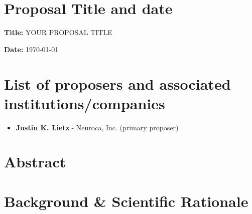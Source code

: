 \documentclass[11pt]{article}
\author[1]{Justin K. Lietz}
\affil[1]{Neuroca, Inc.}
\title{\ProposalTitle}
\date{\ProposalDate}
\newcommand{\ProposalTitle}{YOUR PROPOSAL TITLE}
\newcommand{\ProposalDate}{\today}
\theoremstyle{plain}
\theoremstyle{remark}
\begin{document}
\maketitle

\section{Proposal Title and date}
\textbf{Title:} \ProposalTitle

\textbf{Date:} \ProposalDate


\section{List of proposers and associated institutions/companies}
\begin{itemize}
  \item \textbf{Justin K. Lietz} - Neuroca, Inc. (primary proposer)
\end{itemize}

\section{Abstract}

\section{Background \& Scientific Rationale}
\end{document}
